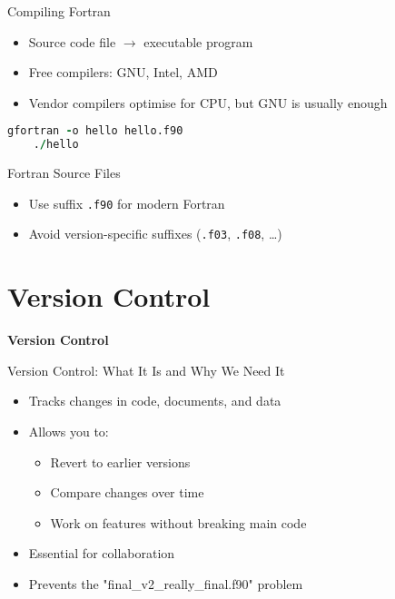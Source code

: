 \begin{frame}[fragile]{Compiling Fortran}
	\begin{itemize}
		\item Source code file $\to$ executable program
		\item Free compilers: GNU, Intel, AMD
		\item Vendor compilers optimise for CPU, but GNU is usually enough
	\end{itemize}
	\begin{lstlisting}[language=Fortran]
	gfortran -o hello hello.f90
	./hello
	\end{lstlisting}
\end{frame}

\begin{frame}{Fortran Source Files}
	\begin{itemize}
		\item Use suffix \texttt{.f90} for modern Fortran
		\item Avoid version-specific suffixes (\texttt{.f03}, \texttt{.f08}, …)
	\end{itemize}
\end{frame}


\section{Version Control}
\begin{frame}
	\centering
	\Huge \textbf{Version Control}
\end{frame}

\begin{frame}{Version Control: What It Is and Why We Need It}
	\begin{itemize}
		\item Tracks changes in code, documents, and data
		\item Allows you to:
		\begin{itemize}
			\item Revert to earlier versions
			\item Compare changes over time
			\item Work on features without breaking main code
		\end{itemize}
		\item Essential for collaboration
		\item Prevents the "final\_v2\_really\_final.f90" problem
	\end{itemize}
\end{frame}

